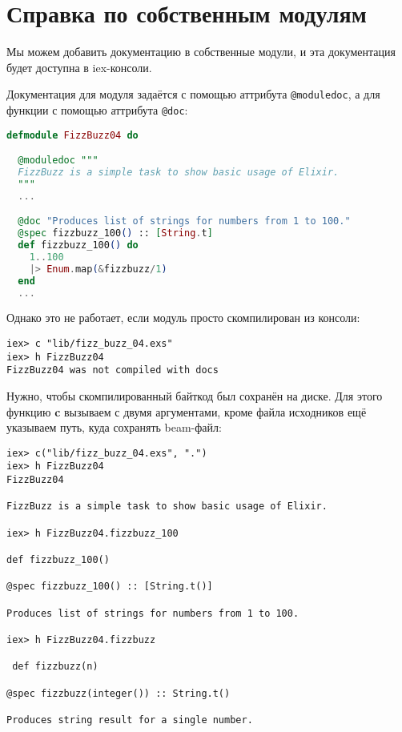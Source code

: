 \section{Справка по собственным модулям}

Мы можем добавить документацию в собственные модули, и эта документация будет доступна в iex-консоли. 

Документация для модуля задаётся с помощью аттрибута \texttt{@moduledoc}, а для функции с помощью аттрибута \texttt{@doc}:

\begin{lstlisting}[language=Elixir, style=elixir]
defmodule FizzBuzz04 do

  @moduledoc """
  FizzBuzz is a simple task to show basic usage of Elixir.
  """
  ...

  @doc "Produces list of strings for numbers from 1 to 100."
  @spec fizzbuzz_100() :: [String.t]
  def fizzbuzz_100() do
    1..100
    |> Enum.map(&fizzbuzz/1)
  end
  ...
\end{lstlisting}
Однако это не работает, если модуль просто скомпилирован из консоли:

\begin{lstlisting}[language=ElixirShell, style=elixir-shell]
iex> c "lib/fizz_buzz_04.exs"
iex> h FizzBuzz04
FizzBuzz04 was not compiled with docs
\end{lstlisting}

Нужно, чтобы скомпилированный байткод был сохранён на диске. Для этого функцию \textbf{c} вызываем с двумя аргументами, кроме файла исходников ещё указываем путь, куда сохранять beam-файл:

\begin{lstlisting}[language=ElixirShell, style=elixir-shell]
iex> c("lib/fizz_buzz_04.exs", ".")
iex> h FizzBuzz04
FizzBuzz04

FizzBuzz is a simple task to show basic usage of Elixir.

iex> h FizzBuzz04.fizzbuzz_100

def fizzbuzz_100()

@spec fizzbuzz_100() :: [String.t()]

Produces list of strings for numbers from 1 to 100.

iex> h FizzBuzz04.fizzbuzz

 def fizzbuzz(n)

@spec fizzbuzz(integer()) :: String.t()

Produces string result for a single number.
\end{lstlisting}

